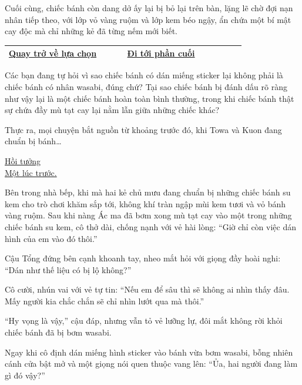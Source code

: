 \documentclass[../main.tex]{subfiles}
\begin{document}
Cuối cùng, chiếc bánh còn dang dở ấy lại bị bỏ lại trên bàn, lặng lẽ chờ đợi nạn nhân tiếp theo, với lớp vỏ vàng ruộm và lớp kem béo ngậy, ẩn chứa một bí mật cay độc mà chỉ những kẻ đã từng nếm mới biết.

\begin{table}[H]
  \centering
  \setlength{\arrayrulewidth}{1pt}
  \begin{tabular}{|>{\centering\arraybackslash}p{0.4\linewidth}|>{\centering\arraybackslash}p{0.4\linewidth}|}
    \hline
    \hyperref[choice]{Quay trở về lựa chọn} & \hyperref[ending]{Đi tới phần cuối} \\ \hline
  \end{tabular}
\end{table}
\newpage
\label{ending}
\omk

\pov{-}

Các bạn đang tự hỏi vì sao chiếc bánh có dán miếng sticker lại không phải là chiếc bánh có nhân wasabi, đúng chứ? Tại sao chiếc bánh bị đánh dấu rõ ràng như vậy lại là một chiếc bánh hoàn toàn bình thường, trong khi chiếc bánh thật sự chứa đầy mù tạt cay lại nằm lẫn giữa những chiếc khác?

Thực ra, mọi chuyện bắt nguồn từ khoảng trước đó, khi Towa và Kuon đang chuẩn bị bánh\dots

\begin{center}
  \uline{Hồi tưởng\\Một lúc trước.}
\end{center}

Bên trong nhà bếp, khi mà hai kẻ chủ mưu đang chuẩn bị những chiếc bánh su kem cho trò chơi khăm sắp tới, không khí tràn ngập mùi kem tươi và vỏ bánh vàng ruộm. Sau khi nàng Ác ma đã bơm xong mù tạt cay vào một trong những chiếc bánh su kem, cô thở dài, chống nạnh với vẻ hài lòng: ``Giờ chỉ còn việc dán hình của em vào đó thôi.''

Cậu Tổng đứng bên cạnh khoanh tay, nheo mắt hỏi với giọng đầy hoài nghi: ``Dán như thế liệu có bị lộ không?''

Cô cười, nhún vai với vẻ tự tin: ``Nếu em để sâu thì sẽ không ai nhìn thấy đâu. Mấy người kia chắc chắn sẽ chỉ nhìn lướt qua mà thôi.''

``Hy vọng là vậy,'' cậu đáp, nhưng vẫn tỏ vẻ lưỡng lự, đôi mắt không rời khỏi chiếc bánh đã bị bơm wasabi.

Ngay khi cô định dán miếng hình sticker vào bánh vừa bơm wasabi, bỗng nhiên cánh cửa bật mở và một giọng nói quen thuộc vang lên: ``Ủa, hai người đang làm gì đó vậy?''
\end{document}
